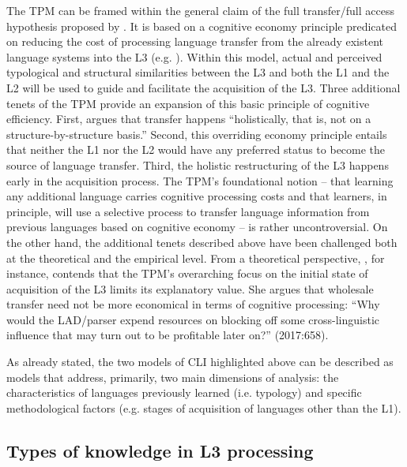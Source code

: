 \documentclass[output=paper,modfonts,nonflat,newtxmath]{langsci/langscibook}
\begin{document}
The TPM can be framed within the general claim of the full transfer/full access hypothesis proposed by \citet{SchwartzSprouse1996}. It is based on a cognitive economy principle predicated on reducing the cost of processing language transfer from the already existent language systems into the L3 (e.g. \citealt{Rothman2011, Rothman2015}). Within this model, actual and perceived typological and structural similarities between the L3 and both the L1 and the L2 will be used to guide and facilitate the acquisition of the L3. Three additional tenets of the TPM provide an expansion of this basic principle of cognitive efficiency. First, \citet[180]{Rothman2015} argues that transfer happens “holistically, that is, not on a structure-by-structure basis.” Second, this overriding economy principle entails that neither the L1 nor the L2 would have any preferred status to become the source of language transfer. Third, the holistic restructuring of the L3 happens early in the acquisition process. The TPM’s foundational notion – that learning any additional language carries cognitive processing costs and that learners, in principle, will use a selective process to transfer language information from previous languages based on cognitive economy – is rather uncontroversial. On the other hand, the additional tenets described above have been challenged both at the theoretical and the empirical level. From a theoretical perspective, \citet{Slabakova2017}, for instance, contends that the TPM’s overarching focus on the initial state of acquisition of the L3 limits its explanatory value. She argues that wholesale transfer need not be more economical in terms of cognitive processing: “Why would the LAD/parser expend resources on blocking off some cross-linguistic influence that may turn out to be profitable later on?” (2017:658).

As already stated, the two models of CLI highlighted above can be described as models that address, primarily, two main dimensions of analysis: the characteristics of languages previously learned (i.e. typology) and specific methodological factors (e.g. stages of acquisition of languages other than the L1).

\subsection{{Types} {of} {knowledge} {in} {L3} {processing}}%
\label{sec:salaberry:2.2}
\end{document}
